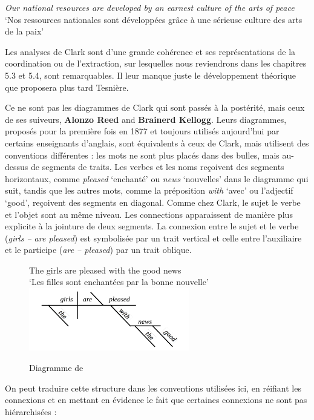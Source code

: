 {    \textit{Our national resources are developed by an earnest culture of the arts of peace}\\
    ‘Nos ressources nationales sont développées grâce à une sérieuse culture des arts de la paix’

    Les analyses de Clark sont d’une grande cohérence et ses représentations de la coordination ou de l’extraction, sur lesquelles nous reviendrons dans les chapitres 5.3 et 5.4, sont remarquables. Il leur manque juste le développement théorique que proposera plus tard Tesnière.

    Ce ne sont pas les diagrammes de Clark qui sont passés à la postérité, mais ceux de ses suiveurs, \textbf{Alonzo Reed} and \textbf{Brainerd Kellogg}. Leurs diagrammes, proposés pour la première fois en 1877 et toujours utilisés aujourd’hui par certains enseignants d’anglais, sont équivalents à ceux de Clark, mais utilisent des conventions différentes : les mots ne sont plus placés dans des bulles, mais au-dessus de segments de traits. Les verbes et les noms reçoivent des segments horizontaux, comme \textit{pleased} ‘enchanté’ ou \textit{news} ‘nouvelles’ dans le diagramme qui suit, tandis que les autres mots, comme la préposition \textit{with} ‘avec’ ou l’adjectif ‘good’, reçoivent des segments en diagonal. Comme chez Clark, le sujet le verbe et l’objet sont au même niveau. Les connections apparaissent de manière plus explicite à la jointure de deux segments. La connexion entre le sujet et le verbe (\textit{girls – are pleased}) est symbolisée par un trait vertical et celle entre l’auxiliaire et le participe (\textit{are – pleased}) par un trait oblique.

    \begin{figure}
    {The girls are pleased with the good news}\\
    ‘Les filles sont enchantées par la bonne nouvelle’\\
    \includegraphics[width=7cm]{figures/ReedKellog}
    \caption{Diagramme de \citet{ReedKellogg1877}}
    \end{figure}

    On peut traduire cette structure dans les conventions utilisées ici, en réifiant les connexions et en mettant en évidence le fait que certaines connexions ne sont pas hiérarchisées :

}
